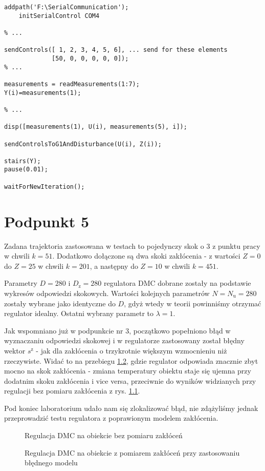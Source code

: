 \begin{lstlisting}[style=Matlab-editor]
addpath('F:\SerialCommunication');
    initSerialControl COM4

% ...

sendControls([ 1, 2, 3, 4, 5, 6], ... send for these elements
             [50, 0, 0, 0, 0, 0]);
% ...
        
measurements = readMeasurements(1:7);
Y(i)=measurements(1);

% ...

disp([measurements(1), U(i), measurements(5), i]);

sendControlsToG1AndDisturbance(U(i), Z(i));

stairs(Y);
pause(0.01);

waitForNewIteration();
\end{lstlisting}

\chapter{Podpunkt 5}
Zadana trajektoria zastosowana w testach to pojedynczy skok o \num{3} z punktu pracy w chwili $ k = 51 $. Dodatkowo dołączone są dwa skoki zakłócenia - z wartości $ Z = 0 $ do $ Z = 25 $ w chwili $ k = 201 $, a następny do $ Z = 10 $ w chwili $ k = 451 $.

Parametry $ D = 280 $ i $ D_\mathrm{z} = 280 $ regulatora DMC dobrane zostały na podstawie wykresów odpowiedzi skokowych. Wartości kolejnych parametrów $ N = N_\mathrm{u} = 280 $ zostały wybrane jako identyczne do $ D $, gdyż wtedy w teorii powinniśmy otrzymać regulator idealny. Ostatni wybrany parametr to $ \lambda = 1 $.

Jak wspomniano już w podpunkcie nr 3, początkowo popełniono błąd w wyznaczaniu odpowiedzi skokowej i w regulatorze zastosowany został błędny wektor $ s^{\mathrm{z}} $ - jak dla zakłócenia o trzykrotnie większym wzmocnieniu niż rzeczywiste. Widać to na przebiegu \ref{R8}, gdzie regulator odpowiada znacznie zbyt mocno na skok zakłócenia - zmiana temperatury obiektu staje się ujemna przy dodatnim skoku zakłócenia i vice versa, przeciwnie do wyników widzianych przy regulacji bez pomiaru zakłócenia z rys. \ref{R7}.

Pod koniec laboratorium udało nam się zlokalizować błąd, nie zdążyliśmy jednak przeprowadzić testu regulatora z poprawionym modelem zakłócenia.

\begin{figure}[ht]
\centering

\caption{Regulacja DMC na obiekcie bez pomiaru zakłóceń}
\label{R7}
\end{figure}

\begin{figure}[ht]
\centering

\caption{Regulacja DMC na obiekcie z pomiarem zakłóceń przy zastosowaniu błędnego modelu}
\label{R8}
\end{figure}
